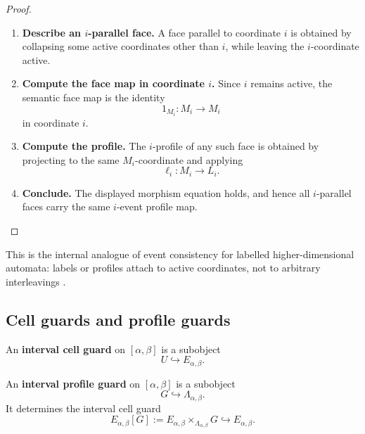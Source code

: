 \begin{proof}
    \leavevmode
    \begin{enumerate}
        \item \textbf{Describe an \(i\)-parallel face.}
        A face parallel to coordinate \(i\) is obtained by collapsing some
        active coordinates other than \(i\), while leaving the \(i\)-coordinate
        active.

        \item \textbf{Compute the face map in coordinate \(i\).}
        Since \(i\) remains active, the semantic face map is the identity
        \[
            1_{M_i}:M_i\to M_i
        \]
        in coordinate \(i\).

        \item \textbf{Compute the profile.}
        The \(i\)-profile of any such face is obtained by projecting to the
        same \(M_i\)-coordinate and applying
        \[
            \ell_i:M_i\to L_i.
        \]

        \item \textbf{Conclude.}
        The displayed morphism equation holds, and hence all \(i\)-parallel
        faces carry the same \(i\)-event profile map.
    \end{enumerate}
\end{proof}

This is the internal analogue of event consistency for labelled
higher-dimensional automata: labels or profiles attach to active coordinates,
not to arbitrary interleavings
\cite{FahrenbergJohansenStruthZiemianski2021,Fahrenberg_2024}.

\subsection{Cell guards and profile guards}
\label{subsec:cmett-cell-profile-guards}

\begin{definition}
\label{def:cmett-interval-cell-guard}
    An \textbf{interval cell guard} on \([\alpha,\beta]\) is a subobject
    \[
        U\hookrightarrow E_{\alpha,\beta}.
    \]
\end{definition}

\begin{definition}
\label{def:cmett-interval-profile-guard}
    An \textbf{interval profile guard} on \([\alpha,\beta]\) is a subobject
    \[
        G\hookrightarrow\Lambda_{\alpha,\beta}.
    \]
    It determines the interval cell guard
    \[
        E_{\alpha,\beta}[G]
        :=
        E_{\alpha,\beta}\times_{\Lambda_{\alpha,\beta}}G
        \hookrightarrow E_{\alpha,\beta}.
    \]
\end{definition}


